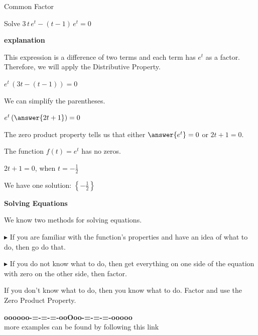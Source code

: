 \documentclass{ximera}
\begin{document}
\begin{example} Common Factor


Solve $3 \, t \, e^t - (t-1) \, e^t = 0$


\textbf{\textcolor{red!75!green}{explanation}} 



This expression is a difference of two terms and each term has $e^t$ as a factor.  Therefore, we will apply the Distributive Property.



$e^t \, (3t - (t-1))= 0$


We can simplify the parentheses.



$e^t \left( \answer{2t + 1} \right)= 0$



The zero product property tells us that either $\answer{e^t} = 0$ or $2t + 1 = 0$.  

The function $f(t) = e^t$ has no zeros. 


$2t + 1 = 0$, when $t = -\frac{1}{2}$

We have one solution: $\left\{ -\frac{1}{2} \right\}$



\end{example}







\begin{procedure} \textbf{\textcolor{purple!30!blue}{Solving Equations}}


We know two methods for solving equations.


\textbf{\textcolor{blue!55!black}{$\blacktriangleright$}} If you are familiar with the function's properties and have an idea of what to do, then go do that. 


\textbf{\textcolor{blue!55!black}{$\blacktriangleright$}} If you do not know what to do, then get everything on one side of the equation with zero on the other side, then factor. 



If you don't know what to do, then you know what to do.  Factor and use the Zero Product Property.


\end{procedure}







\begin{center}
\textbf{\textcolor{green!50!black}{oooooo-=-=-=-ooOoo-=-=-=-ooooo}} \\

more examples can be found by following this link\\ 

\end{center}
\end{document}
